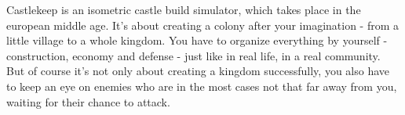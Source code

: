 Castlekeep is an isometric castle build simulator, which takes place in the european middle age. It's about creating a colony after your imagination -\/ from a little village to a whole kingdom. You have to organize everything by yourself -\/ construction, economy and defense -\/ just like in real life, in a real community. But of course it's not only about creating a kingdom successfully, you also have to keep an eye on enemies who are in the most cases not that far away from you, waiting for their chance to attack. 